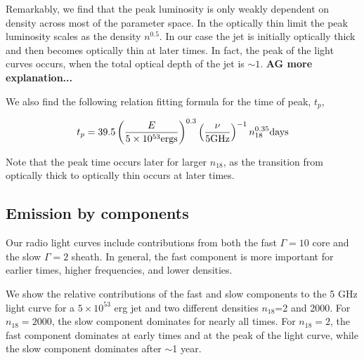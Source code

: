 \documentclass[usenatbib,fleqn]{mnras}
\begin{document}
Remarkably, we find that the peak luminosity is only weakly dependent
on density across most of the parameter space. In the optically thin
limit the peak luminosity scales as the density $n^{0.5}$. In our case the
jet is initially optically thick and then becomes optically thin at
later times. In fact, the peak of the light curves occurs, when the total
optical depth of the jet is $\sim 1$. {\bf AG more explanation...}


We also find the following relation fitting formula for the time of
peak, $t_p$, 

\begin{equation}
t_p = 39.5 \left(\frac{E}{5 \times 10^{53} {\rm ergs}}\right)^{0.3} 
\left(\frac{\nu}{5 {\rm GHz}}\right)^{-1} n_{18}^{0.35} {\rm days}
\label{eq:peakTime}
\end{equation}

Note that the peak time occurs later for larger $n_{18}$, as the
transition from optically thick to optically thin occurs at later times.

\subsection{Emission by components}
Our radio light curves include contributions from both the fast
$\Gamma=10$ core and the slow $\Gamma=2$ sheath. In general, the fast
component is more important for earlier times, higher frequencies, and
lower densities. 

We show the relative contributions of the fast and slow components to
the 5 GHz light curve for a $5 \times 10^{53}$ erg jet and two
different densities $n_{18}$=2 and 2000. For $n_{18}=2000$, the slow
component dominates for nearly all times.  For $n_{18}=2$, the fast
component dominates at early times and at the peak of the light
curve, while the slow component dominates after  $\sim$1 year.
\end{document}
